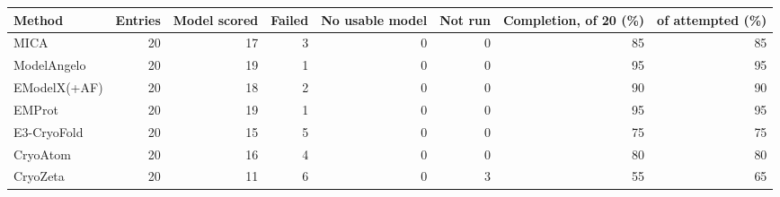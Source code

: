 \begin{tabular}{lrrrrrrr}
\toprule
Method & Entries & Model scored & Failed & No usable model & Not run & Completion, of 20 (\%) & of attempted (\%) \\
\midrule
MICA & 20 & 17 & 3 & 0 & 0 & 85 & 85 \\
ModelAngelo & 20 & 19 & 1 & 0 & 0 & 95 & 95 \\
EModelX(+AF) & 20 & 18 & 2 & 0 & 0 & 90 & 90 \\
EMProt & 20 & 19 & 1 & 0 & 0 & 95 & 95 \\
E3-CryoFold & 20 & 15 & 5 & 0 & 0 & 75 & 75 \\
CryoAtom & 20 & 16 & 4 & 0 & 0 & 80 & 80 \\
CryoZeta & 20 & 11 & 6 & 0 & 3 & 55 & 65 \\
\bottomrule
\end{tabular}
